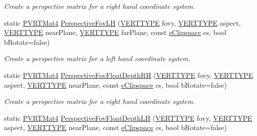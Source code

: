 \begin{DoxyCompactItemize}
\begin{DoxyCompactList}\small\item\em Create a perspective matrix for a right hand coordinate system. \end{DoxyCompactList}\item 
static \hyperlink{struct_p_v_r_t_mat4}{P\+V\+R\+T\+Mat4} \hyperlink{struct_p_v_r_t_mat4_aab27ec251aefa5bd95d533fff0db78ac}{Perspective\+Fov\+L\+H} (\hyperlink{group___a_p_i___o_g_l_e_s_ga06da457b7d3e93368ab904f89e1396be}{V\+E\+R\+T\+T\+Y\+P\+E} fovy, \hyperlink{group___a_p_i___o_g_l_e_s_ga06da457b7d3e93368ab904f89e1396be}{V\+E\+R\+T\+T\+Y\+P\+E} aspect, \hyperlink{group___a_p_i___o_g_l_e_s_ga06da457b7d3e93368ab904f89e1396be}{V\+E\+R\+T\+T\+Y\+P\+E} near\+Plane, \hyperlink{group___a_p_i___o_g_l_e_s_ga06da457b7d3e93368ab904f89e1396be}{V\+E\+R\+T\+T\+Y\+P\+E} far\+Plane, const \hyperlink{struct_p_v_r_t_mat4_aad804cddb0d3f6799550aaa703d71e96}{e\+Clipspace} cs, bool b\+Rotate=false)
\begin{DoxyCompactList}\small\item\em Create a perspective matrix for a left hand coordinate system. \end{DoxyCompactList}\item 
static \hyperlink{struct_p_v_r_t_mat4}{P\+V\+R\+T\+Mat4} \hyperlink{struct_p_v_r_t_mat4_a80a96ab61b05a6092c2a875233a8c24d}{Perspective\+Fov\+Float\+Depth\+R\+H} (\hyperlink{group___a_p_i___o_g_l_e_s_ga06da457b7d3e93368ab904f89e1396be}{V\+E\+R\+T\+T\+Y\+P\+E} fovy, \hyperlink{group___a_p_i___o_g_l_e_s_ga06da457b7d3e93368ab904f89e1396be}{V\+E\+R\+T\+T\+Y\+P\+E} aspect, \hyperlink{group___a_p_i___o_g_l_e_s_ga06da457b7d3e93368ab904f89e1396be}{V\+E\+R\+T\+T\+Y\+P\+E} near\+Plane, const \hyperlink{struct_p_v_r_t_mat4_aad804cddb0d3f6799550aaa703d71e96}{e\+Clipspace} cs, bool b\+Rotate=false)
\begin{DoxyCompactList}\small\item\em Create a perspective matrix for a right hand coordinate system. \end{DoxyCompactList}\item 
static \hyperlink{struct_p_v_r_t_mat4}{P\+V\+R\+T\+Mat4} \hyperlink{struct_p_v_r_t_mat4_a9ba80aac110bef913d9e71844adf79e2}{Perspective\+Fov\+Float\+Depth\+L\+H} (\hyperlink{group___a_p_i___o_g_l_e_s_ga06da457b7d3e93368ab904f89e1396be}{V\+E\+R\+T\+T\+Y\+P\+E} fovy, \hyperlink{group___a_p_i___o_g_l_e_s_ga06da457b7d3e93368ab904f89e1396be}{V\+E\+R\+T\+T\+Y\+P\+E} aspect, \hyperlink{group___a_p_i___o_g_l_e_s_ga06da457b7d3e93368ab904f89e1396be}{V\+E\+R\+T\+T\+Y\+P\+E} near\+Plane, const \hyperlink{struct_p_v_r_t_mat4_aad804cddb0d3f6799550aaa703d71e96}{e\+Clipspace} cs, bool b\+Rotate=false)

\end{DoxyCompactItemize}
